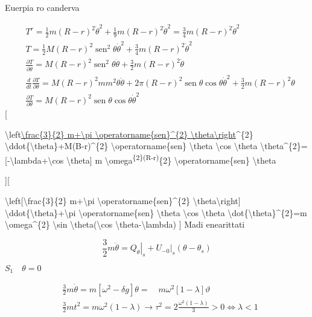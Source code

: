 \documentclass[10pt]{article}
\begin{document}
Euerpia ro canderva

\[
\begin{aligned}
& T^{r}=\frac{1}{2} m(R-r)^{2} \dot{\theta}^{2}+\frac{1}{9} m(R-r)^{2} \dot{\theta}^{2}=\frac{3}{4} m(R-r)^{2} \dot{\theta}^{2} \\
& T=\frac{1}{2} M(R-r)^{2} \operatorname{sen}^{2} \theta \dot{\theta}^{2}+\frac{3}{4} m(R-r)^{2} \dot{\theta}^{2} \\
& \frac{\partial T}{\partial \dot{\theta}}=M(R-r)^{2} \operatorname{sen}^{2} \theta \dot{\theta}+\frac{3}{2} m(R-r)^{2} \dot{\theta} \\
& \frac{d}{d t} \frac{\partial T}{\partial \theta}=M(R-r)^{2} m m^{2} \theta \ddot{\theta}+2 \pi(R-r)^{2} \operatorname{sen} \theta \cos \theta \dot{\theta}^{2}+\frac{3}{2} m(R-r)^{2} \theta \\
& \frac{\partial T}{\partial \theta}=M(R-r)^{2} \operatorname{sen} \theta \cos \theta \dot{\theta}^{2}
\end{aligned}
\][

\textbackslash left\href{%5Cnot-r}{\textbackslash frac\{3\}\{2\} m+\textbackslash pi \textbackslash operatorname\{sen\}\^{}\{2\} \textbackslash theta\textbackslash right}\^{}\{2\} \textbackslash ddot\{\textbackslash theta\}+M(B-r)\^{}\{2\} \textbackslash operatorname\{sen\} \textbackslash theta \textbackslash cos \textbackslash theta \textbackslash theta\^{}\{2\}=[-\textbackslash lambda+\textbackslash cos \textbackslash theta] m \textbackslash omega\textsuperscript{\{2\}(R-r)}\{2\} \textbackslash operatorname\{sen\} \textbackslash theta

][

\textbackslash left[\textbackslash frac\{3\}\{2\} m+\textbackslash pi \textbackslash operatorname\{sen\}\^{}\{2\} \textbackslash theta\textbackslash right] \textbackslash ddot\{\textbackslash theta\}+\textbackslash pi \textbackslash operatorname\{sen\} \textbackslash theta \textbackslash cos \textbackslash theta \textbackslash dot\{\textbackslash theta\}\^{}\{2\}=m \textbackslash omega\^{}\{2\} \textbackslash sin \textbackslash theta(\textbackslash cos \textbackslash theta-\textbackslash lambda)
] Madi enearittati

\[
\frac{3}{2} m \ddot{\theta}=\left.Q_{\theta}\right|_{s}+\left.U_{-0}\right|_{s}\left(\theta-\theta_{s}\right)
\]

\(S_{1} \quad \theta=0\)

\[
\begin{aligned}
& \frac{3}{2} m \dot{\theta}=m\left[\omega^{2}-\delta g\right] \theta=\quad m \omega^{2}[1-\lambda] \vartheta \\
& \frac{3}{2} m t^{2}=m \omega^{2}(1-\lambda) \rightarrow \tau^{2}=2 \frac{\omega^{2}(1-\lambda)}{3}>0 \Leftrightarrow \lambda<1
\end{aligned}
\]
\end{document}

